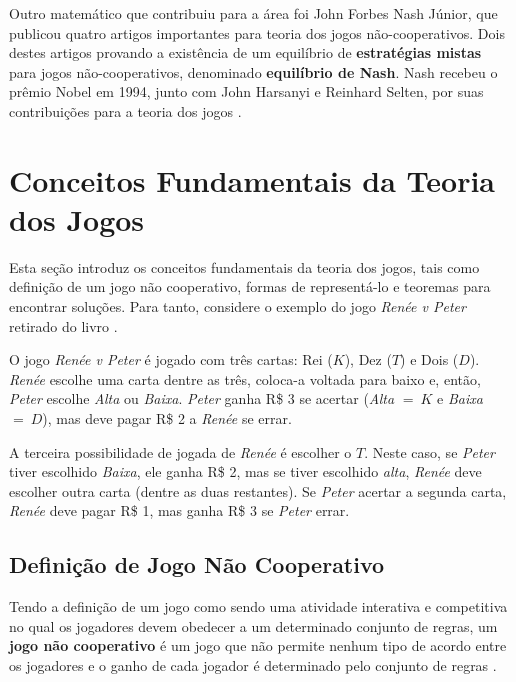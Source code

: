 Outro matemático que contribuiu para a área foi John Forbes Nash Júnior, que publicou quatro artigos importantes para teoria dos jogos não-cooperativos. Dois destes artigos provando a existência de um equilíbrio de \textbf{estratégias mistas} para jogos não-cooperativos, denominado \textbf{equilíbrio de Nash}.
Nash recebeu o prêmio Nobel em 1994, junto com John Harsanyi e Reinhard Selten, por suas contribuições para a teoria dos jogos \cite[p.~3--4]{sartini_IIbienaldasbm}.

\section{Conceitos Fundamentais da Teoria dos Jogos}
\label{sec:conceitos-fundamentais-da-teoria-dos-jogos}

Esta seção introduz os conceitos fundamentais da teoria dos jogos, tais como definição de um jogo não cooperativo, formas de representá-lo e teoremas para encontrar soluções. Para tanto, considere o exemplo do jogo \emph{Renée v Peter} retirado do livro \cite{jones_1980}.

\begin{myex}\label{ex:renee-v-peter}
O jogo \emph{Renée v Peter} é jogado com três cartas: Rei ($K$), Dez ($T$) e Dois ($D$). \emph{Renée} escolhe uma carta dentre as três, coloca-a voltada para baixo e, então, \emph{Peter} escolhe \emph{Alta} ou \emph{Baixa}. \emph{Peter} ganha R\$ 3 se acertar (\emph{Alta} $=\ K$ e \emph{Baixa} $=\ D$), mas deve pagar R\$ 2 a \emph{Renée} se errar.

A terceira possibilidade de jogada de \emph{Renée} é escolher o $T$. Neste caso, se \emph{Peter} tiver escolhido \emph{Baixa}, ele ganha R\$ 2, mas se tiver escolhido \emph{alta}, \emph{Renée} deve escolher outra carta (dentre as duas restantes). Se \emph{Peter} acertar a segunda carta, \emph{Renée} deve pagar R\$ 1, mas ganha R\$ 3 se \emph{Peter} errar.
\end{myex}

\subsection{Definição de Jogo Não Cooperativo}
\label{subsec:definicao-de-jogo-nao-cooperativo}

Tendo a definição de um jogo como sendo uma atividade interativa e competitiva no qual os jogadores devem obedecer a um determinado conjunto de regras, um \textbf{jogo não cooperativo} é um jogo que não permite nenhum tipo de acordo entre os jogadores e o ganho de cada jogador é determinado pelo conjunto de regras \cite{jones_1980}.


